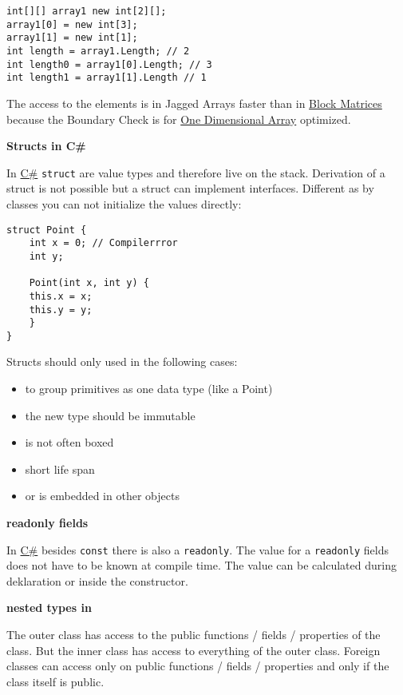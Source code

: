 \documentclass[11pt,twoside,landscape]{article}
\begin{document}
\begin{multicols}{3}
\begin{lstlisting}
int[][] array1 new int[2][];
array1[0] = new int[3];
array1[1] = new int[1];
int length = array1.Length; // 2
int length0 = array1[0].Length; // 3
int length1 = array1[1].Length // 1
\end{lstlisting}

The access to the elements is in Jagged Arrays faster than in \href{../../../roam/20211008083241-multidimension_array_in_c.org}{Block Matrices} because the Boundary Check is for \href{../../../roam/20211008083138-single_dimensional_arrays_in_c.org}{One Dimensional Array} optimized.

\textbf{Structs in C\#}

In \href{../../../roam/20211003114158-c.org}{C\#} \texttt{struct} are value types and therefore live on the stack.
Derivation of a struct is not possible but a struct can implement interfaces.
Different as by classes you can not initialize the values directly:
\lstset{language=csharp,label= ,caption= ,captionpos=b,numbers=none}
\begin{lstlisting}
struct Point {
    int x = 0; // Compilerrror
    int y;

    Point(int x, int y) {
	this.x = x;
	this.y = y;
    }
}

\end{lstlisting}


Structs should only used in the following cases:
\begin{itemize}
\item to group primitives as one data type (like a Point)
\item the new type should be immutable
\item is not often boxed
\item short life span
\item or is embedded in other objects
\end{itemize}


\textbf{readonly fields}

In \href{../../../roam/20211003114158-c.org}{C\#} besides \texttt{const} there is also a \texttt{readonly}.
The value for a \texttt{readonly} fields does not have to be known at compile time.
The value can be calculated during deklaration or inside the constructor.

\textbf{nested types in}

The outer class has access to the public functions / fields / properties of the class.
But the inner class has access to everything of the outer class.
Foreign classes can access only on public functions / fields / properties and only if the class itself is public.


\end{multicols}
\end{document}
